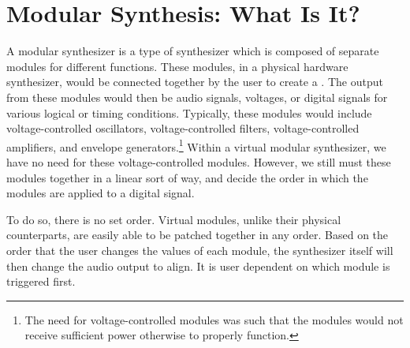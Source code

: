 \section[Modular Synthesis: What Is It?]{Modular Synthesis: What Is It?}\label{section:modular-synth-what-is}

A modular synthesizer is a type of synthesizer which is composed of separate modules for different functions. These modules, in a physical hardware synthesizer, would be connected together by the user to create a . The output from these modules would then be audio signals, voltages, or digital signals for various logical or timing conditions. Typically, these modules would include voltage-controlled oscillators, voltage-controlled filters, voltage-controlled amplifiers, and envelope generators.\footnote{The need for voltage-controlled modules was such that the modules would not receive sufficient power otherwise to properly function.} Within a virtual modular synthesizer, we have no need for these voltage-controlled modules. However, we still must  these modules together in a linear sort of way, and decide the order in which the modules are applied to a digital signal. 

To do so, there is no set order. Virtual modules, unlike their physical counterparts, are easily able to be patched together in any order. Based on the order that the user changes the values of each module, the synthesizer itself will then change the audio output to align. It is user dependent on which module is triggered first.

